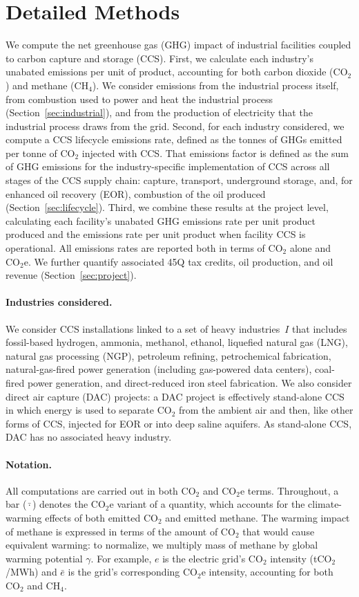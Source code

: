 \documentclass[11pt]{article}
\newcommand{\cotwo}{\ensuremath{\mathrm{CO_2}}}
\newcommand{\cotwoe}{\ensuremath{\mathrm{CO_{2}e}}}
\newcommand{\chfour}{\ensuremath{\mathrm{CH_4}}}
\begin{document}
\section{Detailed Methods}

We compute the net greenhouse gas (GHG) impact of industrial facilities coupled to carbon capture and storage (CCS).
First, we calculate each industry's unabated emissions per unit of product, accounting for both carbon dioxide (\cotwo{}) and methane (\chfour{}). We consider emissions from the industrial process itself, from combustion used to power and heat the industrial process (Section~\ref{sec:industrial}), and from the production of electricity that the industrial process draws from the grid.
Second, for each industry considered, we compute a CCS lifecycle emissions rate, defined as the tonnes of GHGs emitted per tonne of \cotwo{} injected with CCS. That emissions factor is defined as the sum of GHG emissions for the industry-specific implementation of CCS across all stages of the CCS supply chain: capture, transport, underground storage, and, for enhanced oil recovery (EOR), combustion of the oil produced (Section~\ref{sec:lifecycle}).
Third, we combine these results at the project level, calculating each facility's unabated GHG emissions rate per unit product produced and the emissions rate per unit product when facility CCS is operational. All emissions rates are reported both in terms of \cotwo{} alone and \cotwoe{}. We further quantify associated 45Q tax credits, oil production, and oil revenue (Section~\ref{sec:project}).

\paragraph{Industries considered.} We consider CCS installations linked to a set of heavy industries~$I$ that includes fossil-based hydrogen, ammonia, methanol, ethanol, liquefied natural gas (LNG), natural gas processing (NGP), petroleum refining, petrochemical fabrication, natural-gas-fired power generation (including gas-powered data centers), coal-fired power generation, and direct-reduced iron steel fabrication. We also consider direct air capture (DAC) projects: a DAC project is effectively stand-alone CCS in which energy is used to separate \cotwo{} from the ambient air and then, like other forms of CCS, injected for EOR or into deep saline aquifers. As stand-alone CCS, DAC has no associated heavy industry.

\paragraph{Notation.}
All computations are carried out in both \cotwo{} and \cotwoe{} terms.
Throughout, a bar ($\bar{\cdot}$) denotes the \cotwoe{} variant of a quantity, which accounts for the climate-warming effects of both emitted \cotwo{} and emitted methane. The warming impact of methane is expressed in terms of the amount of \cotwo{} that would cause equivalent warming: to normalize, we multiply mass of methane by global warming potential $\gamma$. For example, $e$ is the electric grid's \cotwo{} intensity (t\cotwo{}/MWh) and $\bar{e}$ is the grid's corresponding \cotwoe{} intensity, accounting for both \cotwo{} and \chfour{}.
\end{document}
